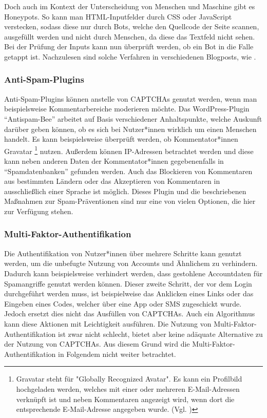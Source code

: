Doch auch im Kontext der Unterscheidung von Menschen und Maschine gibt es Honeypots. 
So kann man HTML-Inputfelder durch CSS oder JavaScript verstecken, sodass diese nur durch Bots, welche den Quellcode der Seite scannen, ausgefüllt werden 
und nicht durch Menschen, da diese das Textfeld nicht sehen. 
Bei der Prüfung der Inputs kann nun überprüft werden, ob ein Bot in die Falle getappt ist. 
Nachzulesen sind solche Verfahren in verschiedenen Blogposts, wie \cite{perry:2019}.

\subsubsection*{Anti-Spam-Plugins}
Anti-Spam-Plugins können anstelle von CAPTCHAs genutzt werden, wenn man beispielsweise Kommentar\-bereiche moderieren möchte.
Das WordPress-Plugin ``Antispam-Bee'' arbeitet auf Basis verschiedener Anhaltspunkte, 
welche Auskunft darüber geben können, ob es sich bei Nutzer*innen wirklich um einen Menschen handelt.
Es kann beispielsweise überprüft werden, ob Kommentator*innen Gravatar
\footnote[3]{Gravatar steht für "Globally Recognized Avatar". 
Es kann ein Profilbild hochgeladen werden, welches mit einer oder mehreren E-Mail-Adressen verknüpft ist 
und neben Kommentaren angezeigt wird, wenn dort die entsprechende E-Mail-Adresse angegeben wurde. (Vgl. \cite{doku:antispambee})} nutzen.
Außerdem können IP-Adressen betrachtet werden und diese kann neben anderen Daten der Kommentator*innen gegebenenfalls in ``Spamdatenbanken'' gefunden werden.
Auch das Blockieren von Kommentaren aus bestimmten Ländern oder das Akzeptieren von Kommentaren in ausschließlich einer Sprache ist möglich.
Dieses Plugin und die beschriebenen Maßnahmen zur Spam-Präventionen sind nur eine von vielen Optionen, die hier zur Verfügung stehen.
\cite{blog:antispambee}
\cite{doku:antispambee}

\subsubsection*{Multi-Faktor-Authentifikation}
Die Authentifikation von Nutzer*innen über mehrere Schritte kann genutzt werden, um die unbefugte Nutzung von Accounts und Ähnlichem zu verhindern.
Dadurch kann beispielsweise verhindert werden, dass gestohlene Accountdaten für Spamangriffe genutzt werden können.
Dieser zweite Schritt, der vor dem Login durchgeführt werden muss, ist beispielweise das Anklicken eines Links oder das Eingeben eines Codes,
welcher über eine App oder SMS zugeschickt wurde.
Jedoch ersetzt dies nicht das Ausfüllen von CAPTCHAs.
Auch ein Algorithmus kann diese Aktionen mit Leichtigkeit ausführen. 
Die Nutzung von Multi-Faktor-Authentifikation ist zwar nicht schlecht,
bietet aber keine adäquate Alternative zu der Nutzung von CAPTCHAs. 
Aus diesem Grund wird die Multi-Faktor-Authentifikation in Folgendem nicht weiter betrachtet.

